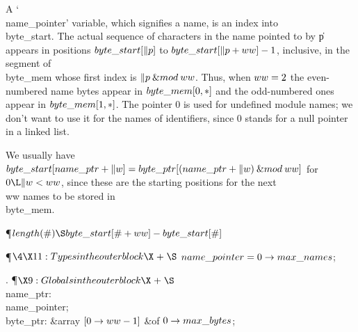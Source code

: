 A `\\{name\_pointer}' variable, which signifies a name, is an index into
\\{byte\_start}. The actual sequence of characters in the name pointed to by
\|p appears in positions $\\{byte\_start}[\|p]$ to $\\{byte\_start}[\|p+%
\\{ww}]-1$, inclusive,
in the segment of \\{byte\_mem} whose first index is $\|p\mathbin{\&{mod}}%
\\{ww}$. Thus, when
$\\{ww}=2$ the even-numbered name bytes appear in $\\{byte\_mem}[0,\hbox{$*$}]$
and the odd-numbered ones appear in $\\{byte\_mem}[1,\hbox{$*$}]$.
The pointer 0 is used for undefined module names; we don't
want to use it for the names of identifiers, since 0 stands for a null
pointer in a linked list.

We usually have $\\{byte\_start}[\\{name\_ptr}+\|w]=\\{byte\_ptr}[(\\{name%
\_ptr}+\|w)\mathbin{\&{mod}}\\{ww}]$
for $0\L\|w<\\{ww}$, since these are the starting positions for the next \\{ww}
names to be stored in \\{byte\_mem}.

\Y\P\D {}$\\{length}(\#)\S\\{byte\_start}[\#+\\{ww}]-\\{byte\_start}[\#]$%
\par
\Y\P$\4\X11:Types in the outer block\X\mathrel{+}\S$\6
$\\{name\_pointer}=0\to\\{max\_names}$;\par
\fi

. \P$\X9:Globals in the outer block\X\mathrel{+}\S$\6
\4\\{name\_ptr}: \\{name\_pointer};\6
\4\\{byte\_ptr}: \&{array} $[0\to\\{ww}-1]$ \1\&{of}\5
$0\to\\{max\_bytes}$;\2\par
\fi

